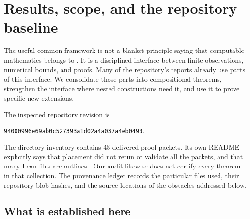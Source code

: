\section{Results, scope, and the repository baseline}
\label{sec:overview}

The useful common framework is not a blanket principle saying that
computable mathematics belongs to \iPRA. It is a disciplined interface
between finite observations, numerical bounds, and proofs. Many of the
repository's reports already use parts of this interface. We consolidate
those parts into compositional theorems, strengthen the interface where
nested constructions need it, and use it to prove specific new extensions.

The inspected repository revision is
\begin{center}
\texttt{94000996e69ab0c527393a1d02a4a037a4eb0493}.
\end{center}
The directory inventory contains 48 delivered proof packets. Its own
README explicitly says that placement did not rerun or validate all the
packets, and that many Lean files are outlines \cite{repo-index}. Our
audit likewise does not certify every theorem in that collection. The
provenance ledger records the particular files used, their repository
blob hashes, and the source locations of the obstacles addressed below.

\subsection{What is established here}

